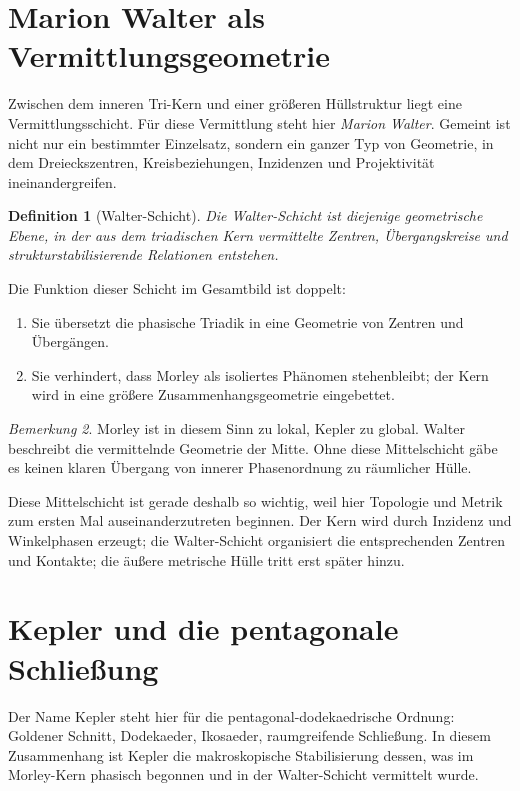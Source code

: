 \documentclass[11pt,a4paper]{article}
\newtheorem{definition}{Definition}[section]
\theoremstyle{remark}
\newtheorem{bemerkung}[definition]{Bemerkung}
\begin{document}
	\section{Marion Walter als Vermittlungsgeometrie}
	
	Zwischen dem inneren Tri-Kern und einer größeren Hüllstruktur liegt eine Vermittlungsschicht. Für diese Vermittlung steht hier \emph{Marion Walter}. Gemeint ist nicht nur ein bestimmter Einzelsatz, sondern ein ganzer Typ von Geometrie, in dem Dreieckszentren, Kreisbeziehungen, Inzidenzen und Projektivität ineinandergreifen.
	
	\begin{definition}[Walter-Schicht]
		Die \emph{Walter-Schicht} ist diejenige geometrische Ebene, in der aus dem triadischen Kern vermittelte Zentren, Übergangskreise und strukturstabilisierende Relationen entstehen.
	\end{definition}
	
	Die Funktion dieser Schicht im Gesamtbild ist doppelt:
	\begin{enumerate}[label=(\alph*)]
		\item Sie übersetzt die phasische Triadik in eine Geometrie von Zentren und Übergängen.
		\item Sie verhindert, dass Morley als isoliertes Phänomen stehenbleibt; der Kern wird in eine größere Zusammenhangsgeometrie eingebettet.
	\end{enumerate}
	
	\begin{bemerkung}
		Morley ist in diesem Sinn zu \glqq lokal\grqq, Kepler zu \glqq global\grqq. Walter beschreibt die vermittelnde Geometrie der Mitte. Ohne diese Mittelschicht gäbe es keinen klaren Übergang von innerer Phasenordnung zu räumlicher Hülle.
	\end{bemerkung}
	
	Diese Mittelschicht ist gerade deshalb so wichtig, weil hier Topologie und Metrik zum ersten Mal auseinanderzutreten beginnen. Der Kern wird durch Inzidenz und Winkelphasen erzeugt; die Walter-Schicht organisiert die entsprechenden Zentren und Kontakte; die äußere metrische Hülle tritt erst später hinzu.
	
	\section{Kepler und die pentagonale Schließung}
	
	Der Name Kepler steht hier für die pentagonal-dodekaedrische Ordnung: Goldener Schnitt, Dodekaeder, Ikosaeder, raumgreifende Schließung. In diesem Zusammenhang ist Kepler die makroskopische Stabilisierung dessen, was im Morley-Kern phasisch begonnen und in der Walter-Schicht vermittelt wurde.
	
\end{document}
